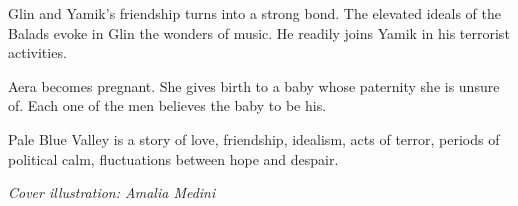 \documentclass[
  spinewidth=0.8325in,
  coverwidth=6in,
  coverheight=9in,
  marklength=0.125in,
  bleedwidth=0.125in,
  12pt
]{bookcover}
\begin{document}
\begin{bookcover}
{{Glin and Yamik's friendship turns into a strong bond. The elevated
ideals of the Balads evoke in Glin the wonders of music. He readily
joins Yamik in his terrorist activities.

Aera becomes pregnant. She gives birth to a baby whose paternity she
is unsure of. Each one of the men believes the baby to be his.

Pale Blue Valley is a story of love, friendship, idealism, acts of
terror, periods of political calm, fluctuations between hope and despair.

\begin{center}
  \textit{Cover illustration: Amalia Medini}
\end{center}
    }

}


\end{bookcover}
\end{document}
